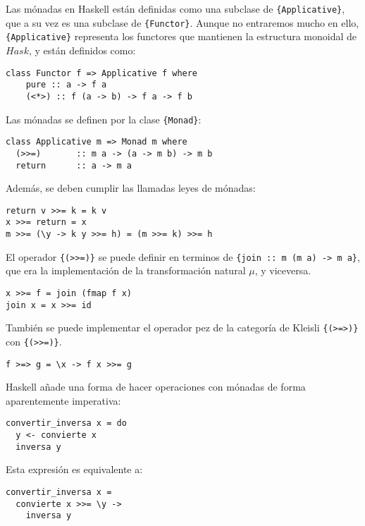 \documentclass[12pt, twoside]{book}
\newcommand{\code}[1]{\Verb+{#1}+}
\newcommand{\Hask}{{Hask}}
\begin{document}
Las mónadas en Haskell están definidas como una subclase de \code{Applicative}, que a su vez es una subclase de \code{Functor}.
Aunque no entraremos mucho en ello, \code{Applicative} representa los functores que mantienen la estructura monoidal de $\Hask$, y están definidos como:
\begin{verbatim}
class Functor f => Applicative f where
    pure :: a -> f a
    (<*>) :: f (a -> b) -> f a -> f b
\end{verbatim}

Las mónadas se definen por la clase \code{Monad}:
\begin{verbatim}
class Applicative m => Monad m where
  (>>=)       :: m a -> (a -> m b) -> m b
  return      :: a -> m a
\end{verbatim}
Además, se deben cumplir las llamadas leyes de mónadas:
\begin{verbatim}
return v >>= k = k v
x >>= return = x
m >>= (\y -> k y >>= h) = (m >>= k) >>= h
\end{verbatim}

El operador \code{(>>=)} se puede definir en terminos de \code{join :: m (m a) -> m a}, que era la implementación de la transformación natural $\mu$, y viceversa.
\begin{verbatim}
x >>= f = join (fmap f x)
join x = x >>= id
\end{verbatim}
También se puede implementar el operador pez de la categoría de Kleisli \code{(>=>)} con \code{(>>=)}.
\begin{verbatim}
f >=> g = \x -> f x >>= g
\end{verbatim}

Haskell añade una forma de hacer operaciones con mónadas de forma aparentemente imperativa:
\begin{verbatim}
convertir_inversa x = do
  y <- convierte x
  inversa y
\end{verbatim}
Esta expresión es equivalente a:
\begin{verbatim}
convertir_inversa x =
  convierte x >>= \y ->
    inversa y
\end{verbatim}
\end{document}
